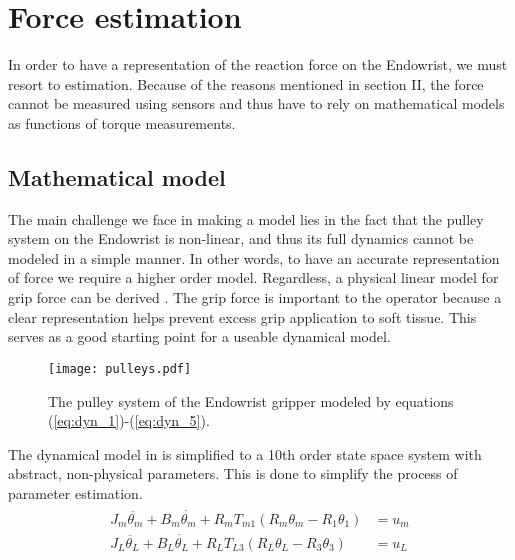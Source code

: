 \section{Force estimation}
In order to have a representation of the reaction force on the Endowrist, we must resort to estimation.
Because of the reasons mentioned in section II, the force cannot be measured using sensors and thus have to rely on mathematical models as functions of torque measurements.

\subsection{Mathematical model}
The main challenge we face in making a model lies in the fact that the pulley system on the Endowrist is non-linear, and thus its full dynamics cannot be modeled in a simple manner. In other words, to have an accurate representation of force we require a higher order model.
Regardless, a physical linear model for grip force can be derived \cite{kim2014dynamic}.
The grip force is important to the operator because a clear representation helps prevent excess grip application to soft tissue.
This serves as a good starting point for a useable dynamical model.

\begin{figure}
\centering
\texttt{[image: pulleys.pdf]}
\caption{The pulley system of the Endowrist gripper modeled by equations (\ref{eq:dyn_1})-(\ref{eq:dyn_5}).}
\end{figure}

The dynamical model in \cite{kim2014dynamic} is simplified to a 10th order state space system with abstract, non-physical parameters.
This is done to simplify the process of parameter estimation.
\begin{gather}
\begin{align}
J_m\ddot{{\theta}_m} + B_m \dot{{\theta}_m} + R_m T_{m1}(R_m {\theta}_m - R_1 {\theta}_1) &= u_m\\
J_L\ddot{{\theta}_L} + B_L \dot{{\theta}_L} + R_L T_{L3}(R_L {\theta}_L - R_3 {\theta}_3) &= u_L
\end{align}
\end{gather}

